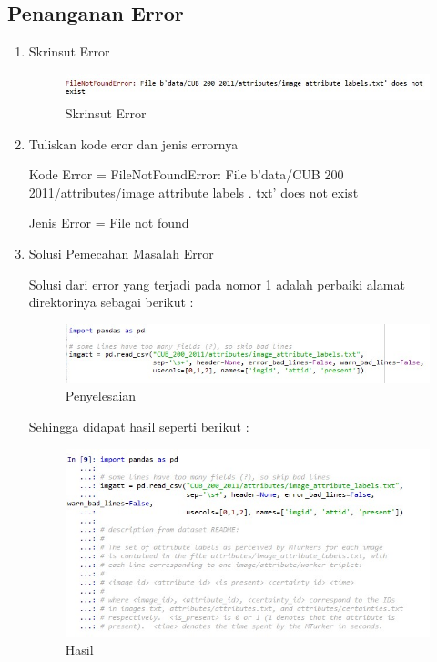 \subsection{Penanganan Error}
\begin{enumerate}
\item Skrinsut Error
	\begin{figure}[!hbtp]
	\centering
	\includegraphics[scale=0.5]{figures/l1.jpg}
	\caption{Skrinsut Error}
	\label{contoh}
	\end{figure}
\item Tuliskan kode eror dan jenis errornya
	\par Kode Error = FileNotFoundError: File b'data/CUB 200 2011/attributes/image attribute labels . txt' does not exist
	\par Jenis Error = File not found
\item Solusi Pemecahan Masalah Error
\par Solusi dari error yang terjadi pada nomor 1 adalah perbaiki alamat direktorinya sebagai berikut :
	\begin{figure}[!hbtp]
	\centering
	\includegraphics[scale=0.5]{figures/l2.jpg}
	\caption{Penyelesaian}
	\label{contoh}
	\end{figure}
\par Sehingga didapat hasil seperti berikut :
	\begin{figure}[!hbtp]
	\centering
	\includegraphics[scale=0.5]{figures/k41.jpg}
	\caption{Hasil}
	\label{contoh}
	\end{figure}
\end{enumerate}




